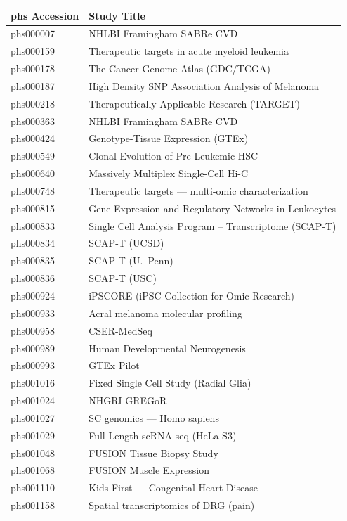 \documentclass[11pt,letterpaper]{article}
\begin{document}
{\small
\begin{longtable}{@{} l p{10cm} @{}}
\toprule
\textbf{phs Accession} & \textbf{Study Title} \\
\midrule
\endhead
phs000007 & NHLBI Framingham SABRe CVD \\
phs000159 & Therapeutic targets in acute myeloid leukemia \\
phs000178 & The Cancer Genome Atlas (GDC/TCGA) \\
phs000187 & High Density SNP Association Analysis of Melanoma \\
phs000218 & Therapeutically Applicable Research (TARGET) \\
phs000363 & NHLBI Framingham SABRe CVD \\
phs000424 & Genotype-Tissue Expression (GTEx) \\
phs000549 & Clonal Evolution of Pre-Leukemic HSC \\
phs000640 & Massively Multiplex Single-Cell Hi-C \\
phs000748 & Therapeutic targets --- multi-omic characterization \\
phs000815 & Gene Expression and Regulatory Networks in Leukocytes \\
phs000833 & Single Cell Analysis Program -- Transcriptome (SCAP-T) \\
phs000834 & SCAP-T (UCSD) \\
phs000835 & SCAP-T (U.\ Penn) \\
phs000836 & SCAP-T (USC) \\
phs000924 & iPSCORE (iPSC Collection for Omic Research) \\
phs000933 & Acral melanoma molecular profiling \\
phs000958 & CSER-MedSeq \\
phs000989 & Human Developmental Neurogenesis \\
phs000993 & GTEx Pilot \\
phs001016 & Fixed Single Cell Study (Radial Glia) \\
phs001024 & NHGRI GREGoR \\
phs001027 & SC genomics --- Homo sapiens \\
phs001029 & Full-Length scRNA-seq (HeLa S3) \\
phs001048 & FUSION Tissue Biopsy Study \\
phs001068 & FUSION Muscle Expression \\
phs001110 & Kids First --- Congenital Heart Disease \\
phs001158 & Spatial transcriptomics of DRG (pain) \\

\end{longtable}}
\end{document}
